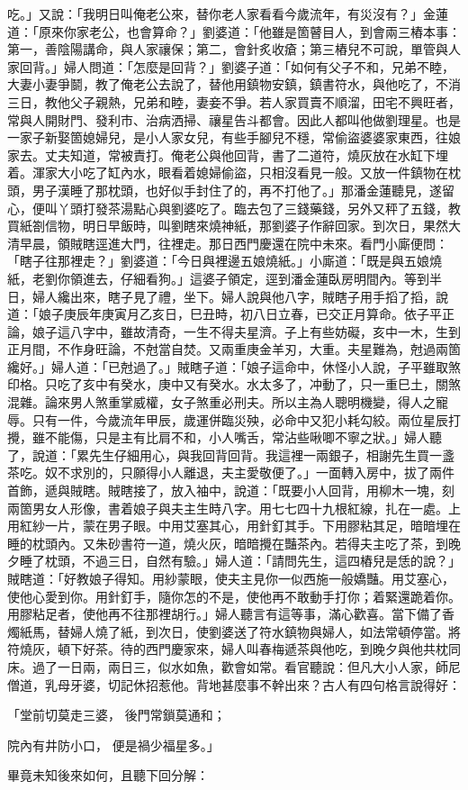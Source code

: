吃。」又說：「我明日叫俺老公來，替你老人家看看今歲流年，有災沒有？」金蓮道：「原來你家老公，也會算命？」劉婆道：「他雖是箇瞽目人，到會兩三樁本事：第一，善陰陽講命，與人家禳保；第二，會針炙收瘡；第三樁兒不可說，單管與人家回背。」婦人問道：「怎麼是回背？」劉婆子道：「如何有父子不和，兄弟不睦，大妻小妻爭鬬，教了俺老公去說了，替他用鎮物安鎮，鎮書符水，與他吃了，不消三日，教他父子親熱，兄弟和睦，妻妾不爭。若人家買賣不順溜，田宅不興旺者，常與人開財門、發利市、治病洒掃、禳星告斗都會。因此人都叫他做劉理星。也是一家子新娶箇媳婦兒，是小人家女兒，有些手腳兒不穩，常偷盜婆婆家東西，往娘家去。丈夫知道，常被責打。俺老公與他回背，書了二道符，燒灰放在水缸下埋着。渾家大小吃了缸內水，眼看着媳婦偷盜，只相沒看見一般。又放一件鎮物在枕頭，男子漢睡了那枕頭，也好似手封住了的，再不打他了。」那潘金蓮聽見，遂留心，便叫丫頭打發茶湯點心與劉婆吃了。臨去包了三錢藥錢，另外又秤了五錢，教買紙劄信物，明日早飯時，叫劉瞎來燒神紙，那劉婆子作辭回家。到次日，果然大清早晨，領賊瞎逕進大門，往裡走。那日西門慶還在院中未來。看門小廝便問：「瞎子往那裡走？」劉婆道：「今日與裡邊五娘燒紙。」小廝道：「既是與五娘燒紙，老劉你領進去，仔細看狗。」這婆子領定，逕到潘金蓮臥房明間內。等到半日，婦人纔出來，瞎子見了禮，坐下。婦人說與他八字，賊瞎子用手搯了搯，說道：「娘子庚辰年庚寅月乙亥日，巳丑時，初八日立春，已交正月算命。依子平正論，娘子這八字中，雖故清奇，一生不得夫星濟。子上有些妨礙，亥中一木，生到正月間，不作身旺論，不尅當自焚。又兩重庚金羊刃，大重。夫星難為，尅過兩箇纔好。」婦人道：「已尅過了。」賊瞎子道：「娘子這命中，休怪小人說，子平雖取煞印格。只吃了亥中有癸水，庚中又有癸水。水太多了，冲動了，只一重巳土，關煞混雜。論來男人煞重掌威權，女子煞重必刑夫。所以主為人聰明機變，得人之寵辱。只有一件，今歲流年甲辰，歲運併臨災殃，必命中又犯小耗勾絞。兩位星辰打攪，雖不能傷，只是主有比肩不和，小人嘴舌，常沾些啾唧不寧之狀。」婦人聽了，說道：「累先生仔細用心，與我回背回背。我這裡一兩銀子，相謝先生買一盞茶吃。奴不求別的，只願得小人離退，夫主愛敬便了。」一面轉入房中，拔了兩件首飾，遞與賊瞎。賊瞎接了，放入袖中，說道：「既要小人回背，用柳木一塊，刻兩箇男女人形像，書着娘子與夫主生時八字。用七七四十九根紅線，扎在一處。上用紅紗一片，蒙在男子眼。中用艾塞其心，用針釘其手。下用膠粘其足，暗暗埋在睡的枕頭內。又朱砂書符一道，燒火灰，暗暗攪在豔茶內。若得夫主吃了茶，到晚夕睡了枕頭，不過三日，自然有驗。」婦人道：「請問先生，這四樁兒是恁的說？」賊瞎道：「好教娘子得知。用紗蒙眼，使夫主見你一似西施一般嬌豔。用艾塞心，使他心愛到你。用針釘手，隨你怎的不是，使他再不敢動手打你；着緊還跪着你。用膠粘足者，使他再不往那裡胡行。」婦人聽言有這等事，滿心歡喜。當下備了香燭紙馬，替婦人燒了紙，到次日，使劉婆送了符水鎮物與婦人，如法常頓停當。將符燒灰，頓下好茶。待的西門慶家來，婦人叫春梅遞茶與他吃，到晚夕與他共枕同床。過了一日兩，兩日三，似水如魚，歡會如常。看官聽說：但凡大小人家，師尼僧道，乳母牙婆，切記休招惹他。背地甚麼事不幹出來？古人有四句格言說得好：

「堂前切莫走三婆，  後門常鎖莫通和；

院內有井防小口，  便是禍少福星多。」

畢竟未知後來如何，且聽下回分解：
